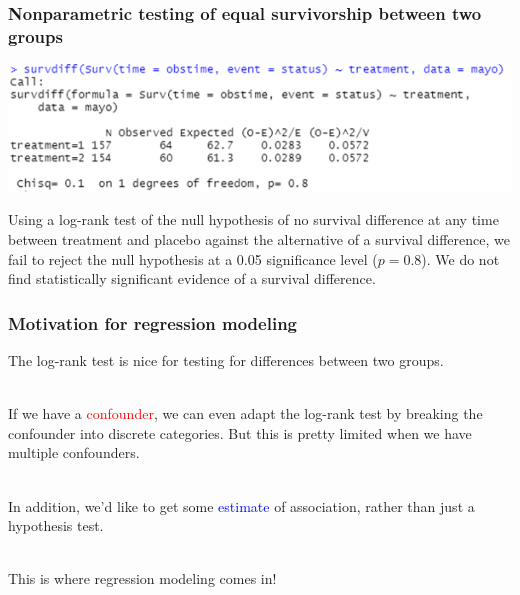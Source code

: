 \documentclass[10pt,t]{beamer}
\begin{document}
\begin{frame}
\frametitle{Nonparametric testing of equal survivorship between two groups}

\begin{center}
	\includegraphics[width=\textwidth]{figs/logrank_code.png}
\end{center}

Using a log-rank test of the null hypothesis of no survival difference at any time between treatment and placebo against the alternative of a survival difference, we fail to reject the null hypothesis at a 0.05 significance level ($p = 0.8$). We do not find statistically significant evidence of a survival difference. 

\end{frame}

\begin{frame}[fragile]
\frametitle{Motivation for regression modeling}
The log-rank test is nice for testing for differences between two groups. 
\\ ~\ 

If we have a \textcolor{red}{confounder}, we can even adapt the log-rank test by breaking the confounder into discrete categories. But this is pretty limited when we have multiple confounders. 
\\ ~\

In addition, we'd like to get some \textcolor{blue}{estimate} of association, rather than just a hypothesis test. 
\\ ~\ 

This is where regression modeling comes in!
\end{frame}
\end{document}
